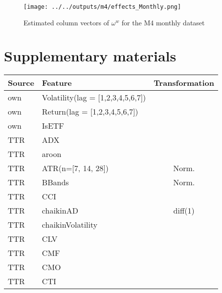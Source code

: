 \documentclass[3p,times,twocolumn]{elsarticle}
\begin{document}
\begin{figure}[!htbp]
    \centering
    \texttt{[image: ../../outputs/m4/effects\_Monthly.png]}
    \caption{
        Estimated column vectors of $\omega^{w}$ for the M4 monthly dataset
    }
    \label{fig:m4_effects_monthly}
\end{figure}

\section{Supplementary materials}\label{section:supplemetary_materials}

\begin{table}[!htbp]
    \fontsize{7}{7}\selectfont
    \centering %
    \begin{tabular}{l l c} %
        \toprule
        Source & Feature                           & Transformation \\
        \midrule
        own    & Volatility(lag = [1,2,3,4,5,6,7]) &                \\
        own    & Return(lag = [1,2,3,4,5,6,7])     &                \\
        own    & IsETF                             &                \\
        TTR    & ADX                               &                \\
        TTR    & aroon                             &                \\
        TTR    & ATR(n=[7, 14, 28])                & Norm.          \\
        TTR    & BBands                            & Norm.          \\
        TTR    & CCI                               &                \\
        TTR    & chaikinAD                         & diff(1)        \\
        TTR    & chaikinVolatility                 &                \\
        TTR    & CLV                               &                \\
        TTR    & CMF                               &                \\
        TTR    & CMO                               &                \\
        TTR    & CTI                               &                \\

\end{tabular}
\end{table}
\end{document}
